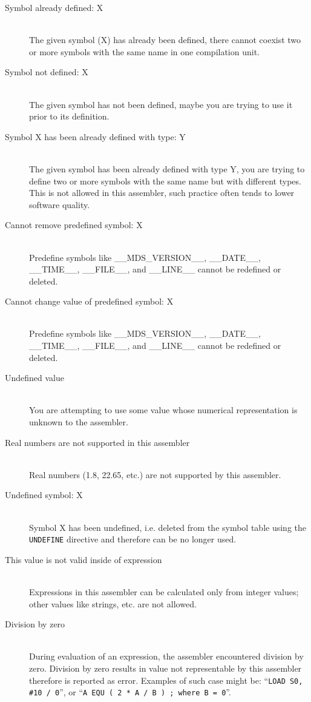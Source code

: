 \begin{description}
        \item[Symbol already defined: X]~\\
            The given symbol (X) has already been defined, there cannot coexist two or more symbols with the same name in one compilation unit.
        \item[Symbol not defined: X]~\\
            The given symbol has not been defined, maybe you are trying to use it prior to its definition.
        \item[Symbol X has been already defined with type: Y]~\\
            The given symbol has been already defined with type Y, you are trying to define two or more symbols with the same name but with different types. This is not allowed in this assembler, such practice often tends to lower software quality.
        \item[Cannot remove predefined symbol: X]~\\
            Predefine symbols like \_\_MDS\_VERSION\_\_, \_\_DATE\_\_, \_\_TIME\_\_, \_\_FILE\_\_, and \_\_LINE\_\_ cannot be redefined or deleted.
        \item[Cannot change value of predefined symbol: X]~\\
            Predefine symbols like \_\_MDS\_VERSION\_\_, \_\_DATE\_\_, \_\_TIME\_\_, \_\_FILE\_\_, and \_\_LINE\_\_ cannot be redefined or deleted.
        \item[Undefined value]~\\
            You are attempting to use some value whose numerical representation is unknown to the assembler.
        \item[Real numbers are not supported in this assembler]~\\
            Real numbers (1.8, 22.65, etc.) are not supported by this assembler.
        \item[Undefined symbol: X]~\\
            Symbol X has been undefined, i.e. deleted from the symbol table using the \texttt{UNDEFINE} directive and therefore can be no longer used.
        \item[This value is not valid inside of expression ]~\\
            Expressions in this assembler can be calculated only from integer values; other values like strings, etc. are not allowed.
        \item[Division by zero]~\\
            During evaluation of an expression, the assembler encountered division by zero. Division by zero results in value not representable by this assembler therefore is reported as error. Examples of such case might be: ``\texttt{LOAD S0, \#10 / 0}'', or ``\texttt{A  EQU  ( 2 * A / B ) ; where B = 0}''.

\end{description}
